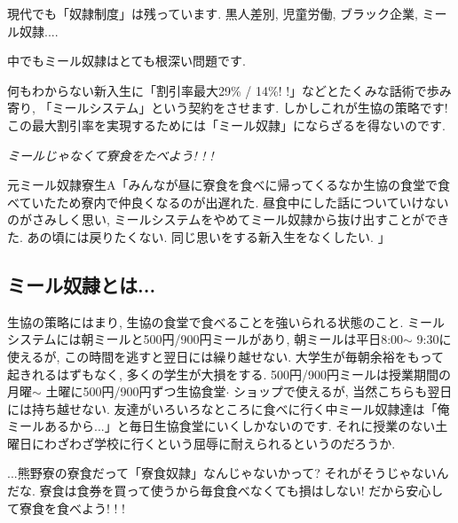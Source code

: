 \documentclass[10pt,b5jsbook,dvips,dvipdfmx,openany]{jsbook}
\theoremstyle{definition}
\begin{document}
	現代でも「奴隷制度」は残っています. 黒人差別, 児童労働, ブラック企業, ミール奴隷.... 

	中でもミール奴隷はとても根深い問題です. 

	何もわからない新入生に「割引率最大29\% / 14\%! !」などとたくみな話術で歩み寄り, 「ミールシステム」という契約をさせます. しかしこれが生協の策略です! この最大割引率を実現するためには「ミール奴隷」にならざるを得ないのです. 

	\emph{\LARGE  ミールじゃなくて寮食をたべよう! ! ! }


	元ミール奴隷寮生A「みんなが昼に寮食を食べに帰ってくるなか生協の食堂で食べていたため寮内で仲良くなるのが出遅れた. 昼食中にした話についていけないのがさみしく思い, ミールシステムをやめてミール奴隷から抜け出すことができた. あの頃には戻りたくない. 同じ思いをする新入生をなくしたい. 」

		\subsection{ミール奴隷とは...}
		生協の策略にはまり, 生協の食堂で食べることを強いられる状態のこと. ミールシステムには朝ミールと500円/900円ミールがあり, 朝ミールは平日8:00$ \sim $ 9:30に使えるが, この時間を逃すと翌日には繰り越せない. 大学生が毎朝余裕をもって起きれるはずもなく, 多くの学生が大損をする. 500円/900円ミールは授業期間の月曜$ \sim $ 土曜に500円/900円ずつ生協食堂$ \cdot $ ショップで使えるが, 当然こちらも翌日には持ち越せない. 友達がいろいろなところに食べに行く中ミール奴隷達は「俺ミールあるから...」と毎日生協食堂にいくしかないのです. それに授業のない土曜日にわざわざ学校に行くという屈辱に耐えられるというのだろうか. 

		...熊野寮の寮食だって「寮食奴隷」なんじゃないかって? 
それがそうじゃないんだな. 寮食は食券を買って使うから毎食食べなくても損はしない! だから安心して寮食を食べよう! ! ! 



\end{document}
